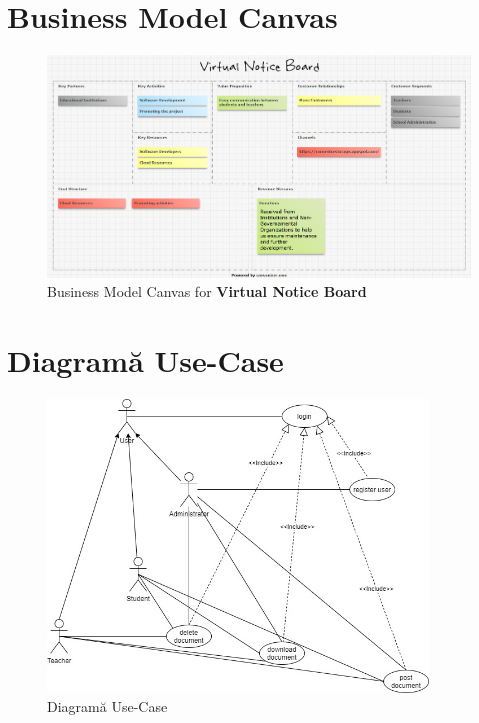 \documentclass[12pt]{article}
\begin{document}
\section{Business Model Canvas}
\begin{figure}[h!]
	\centering
    	\includegraphics[width=1.0\textwidth]{businessCanvas.png}
        \caption{Business Model Canvas for \textbf{Virtual Notice Board}}
\end{figure}

\section{Diagramă Use-Case}
\begin{figure}[h!]
	\centering
    	\includegraphics[width=0.9\textwidth]{use_case.jpg}
        \caption{Diagramă Use-Case}
\end{figure}
\end{document}
